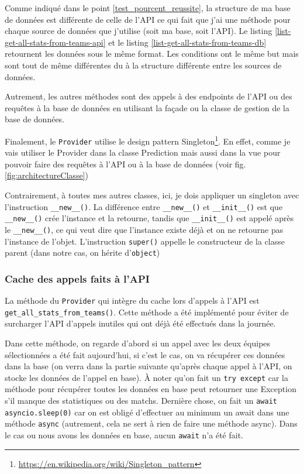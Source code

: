 \documentclass[a4paper,14pt]{extarticle}
\begin{document}
{\newpage


Comme indiqué dans le point \ref{test_pourcent_reussite}, la structure de ma base de données est différente de celle de l'API ce qui fait que j'ai une méthode pour chaque source de données que j'utilise (soit ma base, soit l'API). Le listing \ref{list-get-all-stats-from-teams-api} et le listing \ref{list-get-all-stats-from-teams-db} retournent les données sous le même format. Les conditions ont le même but mais sont tout de même différentes du à la structure différente entre les sources de données. 

Autrement, les autres méthodes sont des appels à des endpoints de l'API ou des requêtes à la base de données en utilisant la façade ou la classe de gestion de la base de données.

Finalement, le \texttt{Provider} utilise le design pattern Singleton\footnote{\url{https://en.wikipedia.org/wiki/Singleton_pattern}}. En effet, comme je vais utiliser le Provider dans la classe Prediction mais aussi dans la vue pour pouvoir faire des requêtes à l'API ou à la base de données (voir fig. \ref{fig:architectureClasse})


Contrairement, à toutes mes autres classes, ici, je dois appliquer un singleton avec l'instruction \texttt{\_\_new\_\_()}. La différence entre \texttt{\_\_new\_\_()} et \texttt{\_\_init\_\_()} est que \texttt{\_\_new\_\_()} crée l'instance et la retourne, tandis que \texttt{\_\_init\_\_()} est appelé après le \texttt{\_\_new\_\_()}, ce qui veut dire que l'instance existe déjà et on ne retourne pas l'instance de l'objet. L'instruction \texttt{super()} appelle le constructeur de la classe parent (dans notre cas, on hérite d'\texttt{object})

\subsubsection{Cache des appels faits à l'API}
\label{cacheAppelsAPI}

La méthode du \texttt{Provider} qui intègre du cache lors d'appels à l'API est \texttt{get\_all\_stats\_from\_teams()}. Cette méthode a été implémenté pour éviter de surcharger l'API d'appels inutiles qui ont déjà été effectués dans la journée.


Dans cette méthode, on regarde d'abord si un appel avec les deux équipes sélectionnées a été fait aujourd'hui, si c'est le cas, on va récupérer ces données dans la base (on verra dans la partie suivante qu'après chaque appel à l'API, on stocke les données de l'appel en base). À noter qu'on fait un \texttt{try except} car la méthode pour récupérer toutes les données en base peut retourner une Exception s'il manque des statistiques ou des matchs. Dernière chose, on fait un \texttt{await asyncio.sleep(0)} car on est obligé d'effectuer au minimum un await dans une méthode \texttt{async} (autrement, cela ne sert à rien de faire une méthode async). Dans le cas ou nous avons les données en base, aucun \texttt{await} n'a été fait.

}
\end{document}
